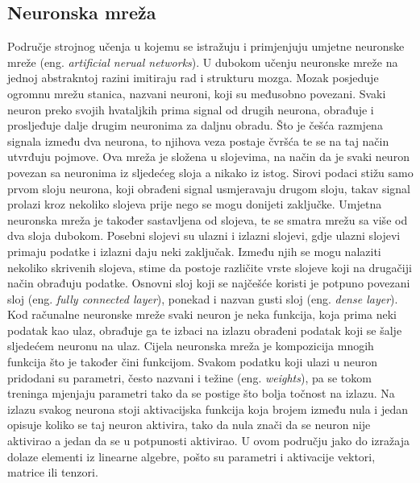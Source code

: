 \subsection{Neuronska mreža}
Područje strojnog učenja u kojemu se istražuju i primjenjuju umjetne neuronske mreže (eng. \textit{artificial nerual networks}). U dubokom učenju neuronske mreže na jednoj abstrakntoj razini imitiraju rad i strukturu mozga. Mozak posjeduje ogromnu mrežu stanica, nazvani neuroni, koji su međusobno povezani. Svaki neuron preko svojih hvataljkih prima signal od drugih neurona, obrađuje i prosljeđuje dalje drugim neuronima za daljnu obradu. Što je češća razmjena signala između dva neurona, to njihova veza postaje čvršća te se na taj način utvrđuju pojmove. Ova mreža je složena u slojevima, na način da je svaki neuron povezan sa neuronima iz sljedećeg sloja a nikako iz istog. Sirovi podaci stižu samo prvom sloju neurona, koji obrađeni signal usmjeravaju drugom sloju, takav signal prolazi kroz nekoliko slojeva prije nego se mogu donijeti zaključke. Umjetna neuronska mreža je također sastavljena od slojeva, te se smatra mrežu sa više od dva sloja dubokom. Posebni slojevi su ulazni i izlazni slojevi, gdje ulazni slojevi primaju podatke i izlazni daju neki zaključak. Između njih se mogu nalaziti nekoliko skrivenih slojeva, stime da postoje različite vrste slojeve koji na drugačiji način obrađuju podatke. Osnovni sloj koji se najčešće koristi je potpuno povezani sloj (eng. \textit{fully connected layer}), ponekad i nazvan gusti sloj (eng. \textit{dense layer}). Kod računalne neuronske mreže svaki neuron je neka funkcija, koja prima neki podatak kao ulaz, obrađuje ga te izbaci na izlazu obrađeni podatak koji se šalje sljedećem neuronu na ulaz. Cijela neuronska mreža je kompozicija mnogih funkcija što je također čini funkcijom. Svakom podatku koji ulazi u neuron pridodani su parametri, često nazvani i težine (eng. \textit{weights}), pa se tokom treninga mjenjaju parametri tako da se postige što bolja točnost na izlazu. Na izlazu svakog neurona stoji aktivacijska funkcija koja brojem između nula i jedan opisuje koliko se taj neuron aktivira, tako da nula znači da se neuron nije aktivirao a jedan da se u potpunosti aktivirao. U ovom području jako do izražaja dolaze elementi iz linearne algebre, pošto su parametri i aktivacije vektori, matrice ili tenzori. 

